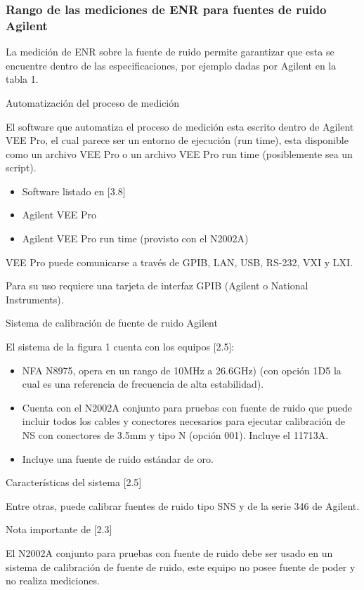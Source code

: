 \subsubsection{Rango de las mediciones de ENR para fuentes de ruido Agilent}
La medición de ENR sobre la fuente de ruido permite garantizar que esta se encuentre dentro de las especificaciones, por ejemplo dadas por Agilent en la tabla 1.		

Automatización del proceso de medición

El software que automatiza el proceso de medición esta escrito dentro de Agilent VEE Pro, el cual parece ser un entorno de ejecución (run time), esta disponible como un archivo VEE Pro o un archivo VEE Pro run time (posiblemente sea un script). 

\begin{itemize}
\item Software listado en [3.8]
\item Agilent VEE Pro
\item Agilent VEE Pro run time (provisto con el N2002A)
\end{itemize}
VEE Pro puede comunicarse a través de GPIB, LAN, USB, RS-232, VXI y LXI.

Para su uso requiere una tarjeta de interfaz GPIB (Agilent o National Instruments).

Sistema de calibración de fuente de ruido Agilent		

El sistema de la figura 1 cuenta con los equipos [2.5]:

\begin{itemize}
\item NFA N8975, opera en un rango de 10MHz a 26.6GHz) (con opción 1D5 la cual es una referencia de frecuencia de alta
estabilidad). 
\item Cuenta con el N2002A conjunto para pruebas con fuente de ruido que puede incluir todos los cables y conectores
necesarios para ejecutar calibración de NS con conectores de 3.5mm y tipo N (opción 001). Incluye el 11713A. 
\item Incluye una fuente de ruido estándar de oro.
\end{itemize}
Características del sistema [2.5]

Entre otras, puede calibrar fuentes de ruido tipo SNS y de la serie 346 de Agilent.

Nota importante de [2.3]

El N2002A conjunto para pruebas con fuente de ruido debe ser usado en un sistema de calibración de fuente de ruido, este
equipo no posee fuente de poder y no realiza mediciones.

